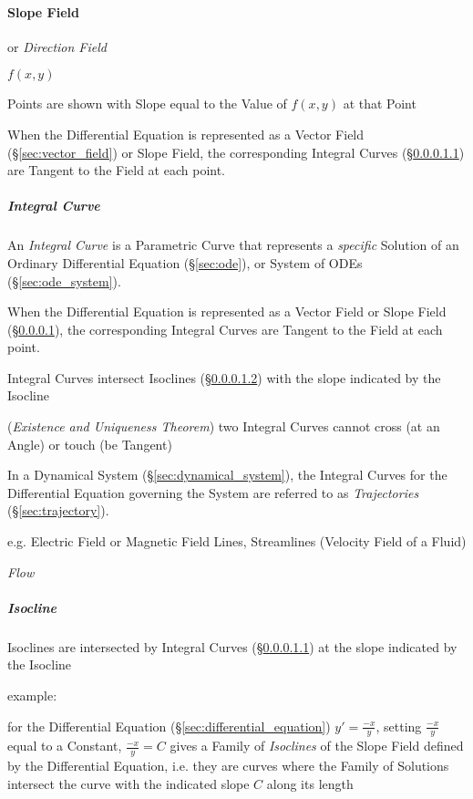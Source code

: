 \paragraph{Slope Field}\label{sec:slope_field}\hfill

or \emph{Direction Field}

$f(x,y)$

Points are shown with Slope equal to the Value of $f(x,y)$ at that Point

When the Differential Equation is represented as a Vector Field
(\S\ref{sec:vector_field}) or Slope Field, the corresponding Integral Curves
(\S\ref{sec:integral_curve}) are Tangent to the Field at each point.



\subparagraph{Integral Curve}\label{sec:integral_curve}\hfill

An \emph{Integral Curve} is a Parametric Curve that represents a
\emph{specific} Solution of an Ordinary Differential Equation
(\S\ref{sec:ode}), or System of ODEs (\S\ref{sec:ode_system}).

When the Differential Equation is represented as a Vector Field or Slope Field
(\S\ref{sec:slope_field}), the corresponding Integral Curves are Tangent to the
Field at each point.

Integral Curves intersect Isoclines (\S\ref{sec:isocline}) with the slope
indicated by the Isocline

(\emph{Existence and Uniqueness Theorem}) two Integral Curves cannot cross (at
an Angle) or touch (be Tangent)

In a Dynamical System (\S\ref{sec:dynamical_system}), the Integral Curves for
the Differential Equation governing the System are referred to as
\emph{Trajectories} (\S\ref{sec:trajectory}).

e.g. Electric Field or Magnetic Field Lines, Streamlines (Velocity Field of a
Fluid)

\emph{Flow}



\subparagraph{Isocline}\label{sec:isocline}\hfill

Isoclines are intersected by Integral Curves (\S\ref{sec:integral_curve}) at
the slope indicated by the Isocline

example:

for the Differential Equation (\S\ref{sec:differential_equation}) $y' =
\frac{-x}{y}$, setting $\frac{-x}{y}$ equal to a Constant, $\frac{-x}{y} = C$
gives a Family of \emph{Isoclines} of the Slope Field defined by the
Differential Equation, i.e. they are curves where the Family of Solutions
intersect the curve with the indicated slope $C$ along its length



